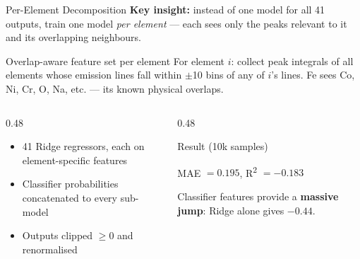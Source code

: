 \begin{frame}{Per-Element Decomposition}
    \textbf{Key insight:} instead of one model for all 41 outputs, train one model \textit{per element} — each sees only the peaks relevant to it and its overlapping neighbours.

    \vspace{0.15cm}
    \begin{block}{Overlap-aware feature set per element}
        For element $i$: collect peak integrals of all elements whose emission lines fall within $\pm$10 bins of any of $i$'s lines. Fe sees Co, Ni, Cr, O, Na, etc. — its known physical overlaps.
    \end{block}

    \vspace{0.15cm}
    \begin{columns}
        \begin{column}{0.48\textwidth}
            \begin{itemize}
                \item 41 Ridge regressors, each on element-specific features
                \item Classifier probabilities concatenated to every sub-model
                \item Outputs clipped $\geq 0$ and renormalised
            \end{itemize}
        \end{column}
        \begin{column}{0.48\textwidth}
            \begin{block}{Result (10k samples)}
                \begin{center}
                    MAE $= 0.195$, R\textsuperscript{2} $= -0.183$
                \end{center}
                \small Classifier features provide a \textbf{massive jump}: Ridge alone gives $-0.44$.
            \end{block}
        \end{column}
    \end{columns}
\end{frame}


